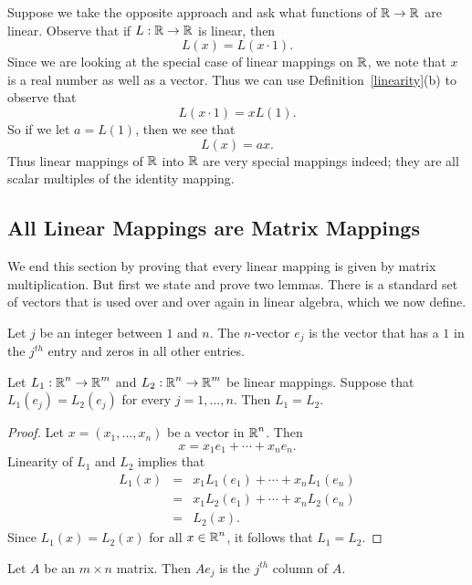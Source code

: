 \documentclass{ximera}
\begin{document}
Suppose we take the opposite approach and ask what functions of
$\mbox{$\Bbb{R}$}\to\mbox{$\Bbb{R}$}$ are linear.  Observe that if $L:\mbox{$\Bbb{R}$}\to\mbox{$\Bbb{R}$}$ is linear,
then
\[
L(x) = L(x\cdot 1).
\]
Since we are looking at the special case of linear mappings on
$\mbox{$\Bbb{R}$}$, we note that $x$ is a real number as well as a vector.
Thus we can use Definition~\ref{linearity}(b) to observe that
\[
L(x\cdot 1)=xL(1).
\]
So if we let $a=L(1)$, then we see that
\[
L(x)=ax.
\]
Thus linear mappings of $\mbox{$\Bbb{R}$}$ into $\mbox{$\Bbb{R}$}$ are very special mappings
indeed; they are all scalar multiples of the identity mapping.

\subsection*{All Linear Mappings are Matrix Mappings}

We end this section by proving that every linear mapping is
given by matrix multiplication. But first we state and prove two
lemmas.  There is a standard set of vectors that is used over
and over again in linear algebra, which we now define.

\begin{definition}  \label{D:canonicalbasis}
Let $j$ be an integer between $1$ and $n$.  The $n$-vector $e_j$ is
the vector that has a $1$ in the $j^{th}$ entry and zeros in all
other entries.
\end{definition} 

\begin{lemma}  \label{linequal}
Let $L_1:\mbox{$\Bbb{R}$}^n\to\mbox{$\Bbb{R}$}^m$ and $L_2:\mbox{$\Bbb{R}$}^n\to\mbox{$\Bbb{R}$}^m$ be linear mappings.
Suppose that $L_1(e_j)=L_2(e_j)$ for every $j=1,\ldots,n$.  Then
$L_1=L_2$.
\end{lemma}

\begin{proof}  Let $x=(x_1,\ldots,x_n)$ be a vector in $\mbox{$\Bbb{R}$}^n$.  Then
\[
x = x_1e_1 + \cdots + x_ne_n.
\]
Linearity of $L_1$ and $L_2$ implies that
\begin{eqnarray*}
L_1(x) & = & x_1L_1(e_1) + \cdots + x_nL_1(e_n) \\
  & = & x_1L_2(e_1) + \cdots + x_nL_2(e_n) \\
  & = & L_2(x).
\end{eqnarray*}
Since $L_1(x)=L_2(x)$ for all $x\in\mbox{$\Bbb{R}$}^n$, it follows that
$L_1=L_2$.  \end{proof}

\begin{lemma}  \label{columnsA}
Let $A$ be an $m\times n$ matrix.  Then $Ae_j$ is the $j^{th}$
column of $A$.
\end{lemma}
\end{document}
